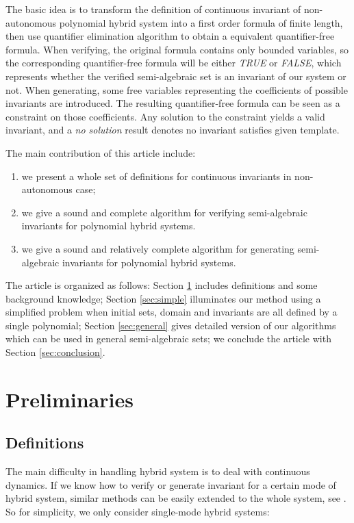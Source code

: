 \documentclass{article}
\begin{document}
The basic idea is to transform the definition of continuous invariant of non-autonomous polynomial hybrid system into a first order formula of finite length, then use quantifier elimination algorithm to obtain a equivalent quantifier-free formula. When verifying, the original formula contains only bounded variables, so the corresponding quantifier-free  formula will be either \emph{TRUE} or \emph{FALSE}, which represents whether the verified semi-algebraic set is an invariant of our system or not. When generating, some free variables representing the coefficients of possible invariants are introduced. The resulting quantifier-free formula can be seen as a constraint on those coefficients. Any solution to the constraint yields a valid invariant, and a \emph{no solution} result denotes no invariant satisfies given template.

The main contribution of this article include: 
\begin{enumerate}
	\item we present a whole set of definitions for continuous invariants in non-autonomous case; 
	\item we give a sound and complete algorithm for verifying semi-algebraic invariants for polynomial hybrid systems.
	\item we give a sound and relatively complete algorithm for generating semi-algebraic invariants for polynomial hybrid systems.
\end{enumerate}

The article is organized as follows: Section \ref{sec:preliminaries} includes definitions and some background knowledge; Section \ref{sec:simple} illuminates our method using a simplified problem when initial sets, domain and invariants are all defined by a single polynomial; Section \ref{sec:general} gives detailed version of our algorithms which can be used in general semi-algebraic sets; we conclude the article with Section \ref{sec:conclusion}.

\section{Preliminaries}
\label{sec:preliminaries}
\subsection{Definitions}
The main difficulty in handling hybrid system is to deal with continuous dynamics. If we know how to verify or generate invariant for a certain mode of hybrid system, similar methods can be easily extended to the whole system, see \cite{prajna2004safety, kong2016invariant}. So for simplicity, we only consider single-mode hybrid systems:
\end{document}
